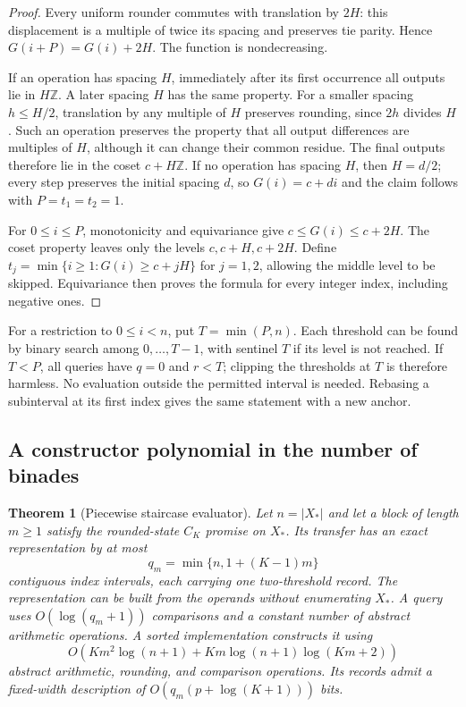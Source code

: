 \documentclass[11pt,reqno]{amsart}
\newtheorem{theorem}{Theorem}[section]
\theoremstyle{definition}
\theoremstyle{remark}
\numberwithin{equation}{section}
\begin{document}
\begin{proof}
Every uniform rounder commutes with translation by $2H$: this displacement
is a multiple of twice its spacing and preserves tie parity. Hence
$G(i+P)=G(i)+2H$. The function is nondecreasing.

If an operation has spacing $H$, immediately after its first occurrence
all outputs lie in $H\mathbb Z$. A later spacing $H$ has the same property.
For a smaller spacing $h\leq H/2$, translation by any multiple of $H$
preserves rounding, since $2h$ divides $H$. Such an operation preserves
the property that all output differences are multiples of $H$, although
it can change their common residue. The final outputs therefore lie in
the coset $c+H\mathbb Z$. If no operation has spacing $H$, then $H=d/2$;
every step preserves the initial spacing $d$, so $G(i)=c+di$ and the
claim follows with $P=t_1=t_2=1$.

For $0\leq i\leq P$, monotonicity and equivariance give
$c\leq G(i)\leq c+2H$. The coset property leaves only the levels
$c,c+H,c+2H$. Define $t_j=\min\{i\geq1:G(i)\geq c+jH\}$ for
$j=1,2$, allowing the middle level to be skipped.
Equivariance then proves the formula for every integer index, including
negative ones.
\end{proof}

For a restriction to $0\leq i<n$, put $T=\min(P,n)$. Each threshold can
be found by binary search among $0,\ldots,T-1$, with sentinel $T$ if its
level is not reached. If $T<P$, all queries have $q=0$ and $r<T$; clipping
the thresholds at $T$ is therefore harmless. No evaluation outside the
permitted interval is needed. Rebasing a subinterval at its first index
gives the same statement with a new anchor.

\clearpage
\begin{samepage}
\subsection{A constructor polynomial in the number of binades}

\begin{theorem}[Piecewise staircase evaluator]\label{thm:staircase}
Let $n=|X_\ast|$ and let a block of length $m\geq1$ satisfy the rounded-state
$C_K$ promise on $X_\ast$. Its transfer has an exact representation by
at most
\[
 q_m=\min\{n,1+(K-1)m\}
\]
contiguous index intervals, each carrying one two-threshold record.
The representation can be built from the operands without enumerating
$X_\ast$. A query uses $O(\log(q_m+1))$ comparisons and a constant number
of abstract arithmetic operations. A sorted implementation constructs it
using
\begin{equation}\label{eq:staircase-construction}
 O\!\left(Km^2\log(n+1)+Km\log(n+1)\log(Km+2)\right)
\end{equation}
abstract arithmetic, rounding, and comparison operations. Its records
admit a fixed-width description of $O(q_m(p+\log(K+1)))$ bits.
\end{theorem}
\end{samepage}
\end{document}
